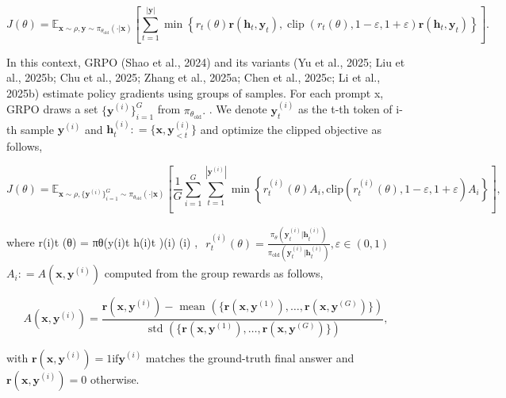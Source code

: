 \documentclass[
  10
]{article}
\begin{document}
\[
J (\theta) = \mathbb {E} _ {\mathbf {x} \sim \rho , \mathbf {y} \sim \pi_ {\theta_ {\mathrm{old}}} (\cdot | \mathbf {x})} \left[ \sum_ {t = 1} ^ {| \mathbf {y} |} \min \left\{r _ {t} (\theta) \mathbf {r} (\mathbf {h} _ {t}, \mathbf {y} _ {t}), \operatorname{clip} (r _ {t} (\theta), 1 - \varepsilon , 1 + \varepsilon) \mathbf {r} (\mathbf {h} _ {t}, \mathbf {y} _ {t}) \right\} \right].
\]

In this context, GRPO (Shao et al., 2024) and its variants (Yu et al.,
2025; Liu et al., 2025b; Chu et al., 2025; Zhang et al., 2025a; Chen et
al., 2025c; Li et al., 2025b) estimate policy gradients using groups of
samples. For each prompt x, GRPO draws a set
\(\{ \mathbf { y } ^ { ( i ) } \} _ { i = 1 } ^ { G }\) from
\(\pi _ { \theta _ { \mathrm { o l d } } } .\) . We denote
\(\mathbf { y } _ { t } ^ { ( i ) }\) as the t-th token of i-th sample
\(\mathbf { y } ^ { ( i ) }\) and
\(\mathbf { h } _ { t } ^ { ( i ) } : = \{ \mathbf { x } , \mathbf { y } _ { < t } ^ { ( i ) } \}\)
and optimize the clipped objective as follows,

\[
J (\theta) = \mathbb {E} _ {\mathbf {x} \sim \rho , \{\mathbf {y} ^ {(i)} \} _ {i = 1} ^ {G} \sim \pi_ {\theta_ {\mathrm{old}}} (\cdot | \mathbf {x})} \left[ \frac {1}{G} \sum_ {i = 1} ^ {G} \sum_ {t = 1} ^ {| \mathbf {y} ^ {(i)} |} \min \left\{r _ {t} ^ {(i)} (\theta) A _ {i}, \mathrm{clip} (r _ {t} ^ {(i)} (\theta), 1 - \varepsilon , 1 + \varepsilon) A _ {i} \right\} \right],
\]

where r(i)t (θ) = πθ(y(i)t \textbar h(i)t )(i) (i) ,
\(\begin{array} { r } { r _ { t } ^ { ( i ) } ( \theta ) = \frac { \pi _ { \theta } ( \mathbf { y } _ { t } ^ { ( i ) } | \mathbf { h } _ { t } ^ { ( i ) } ) } { \pi _ { \mathrm { o l d } } ( \mathbf { y } _ { t } ^ { ( i ) } | \mathbf { h } _ { t } ^ { ( i ) } ) } , \varepsilon \in ( 0 , 1 ) } \end{array}\)
\(A _ { i } : = A ( \mathbf { x } , \mathbf { y } ^ { ( i ) } )\)
computed from the group rewards as follows,

\[
A (\mathbf {x}, \mathbf {y} ^ {(i)}) = \frac {\mathbf {r} (\mathbf {x} , \mathbf {y} ^ {(i)}) - \text { mean } (\{\mathbf {r} (\mathbf {x} , \mathbf {y} ^ {(1)}) , \dots , \mathbf {r} (\mathbf {x} , \mathbf {y} ^ {(G)}) \})}{\text { std } (\{\mathbf {r} (\mathbf {x} , \mathbf {y} ^ {(1)}) , \dots , \mathbf {r} (\mathbf {x} , \mathbf {y} ^ {(G)}) \})}, \tag {1}
\]

with
\(\mathbf { r } ( \mathbf { x } , \mathbf { y } ^ { ( i ) } ) = 1 \mathrm { i f } \mathbf { y } ^ { ( i ) }\)
matches the ground-truth final answer and
\(\mathbf { r } ( \mathbf { x } , \mathbf { y } ^ { ( i ) } ) = 0\)
otherwise.
\end{document}
